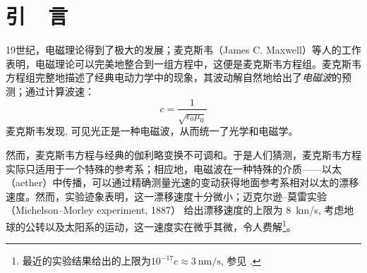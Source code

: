 \documentclass{buaaemp}
\begin{document}



\wuhao 

\section{引~~言}
19世纪，电磁理论得到了极大的发展；麦克斯韦（James C. Maxwell）等人的工作表明，电磁理论可以完美地整合到一组方程中\supercite{maxwell1865dynamical}，这便是麦克斯韦方程组。麦克斯韦方程组完整地描述了经典电动力学中的现象，其波动解自然地给出了\textit{电磁波}的预测；通过计算波速：
	\begin{equation}
		c = \frac{1}{\sqrt{\epsilon_0\mu_0}}
		\label{eq:lightSpeed}
	\end{equation}
	麦克斯韦发现\supercite{maxwell1865dynamical}, 可见光正是一种电磁波，从而统一了光学和电磁学。
	
	然而，麦克斯韦方程与经典的伽利略变换不可调和。于是人们猜测，麦克斯韦方程实际只适用于一个特殊的参考系；相应地，电磁波在一种特殊的介质——以太（aether）中传播，可以通过精确测量光速的变动获得地面参考系相对以太的漂移速度。然而，实验迹象表明，这一漂移速度十分微小；迈克尔逊--莫雷实验（Michelson–Morley experiment, 1887）\supercite{michelson1887relative} 给出漂移速度的上限为 \SI{8}{\km/\s}, 考虑地球的公转以及太阳系的运动，这一速度实在微乎其微，令人费解\footnote{%
		最近的实验结果给出的上限为$10^{-17}c \approx \SI{3}{\nm/\s}$, 参见 \cite{herrmann2009rotating}. 
	}。
\end{document}
